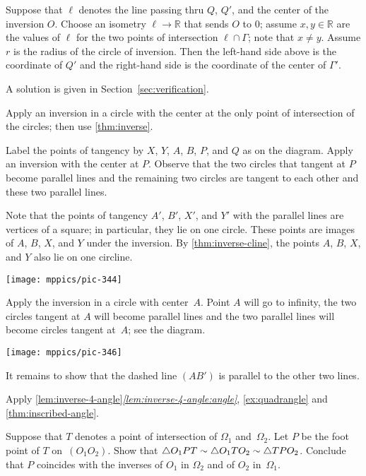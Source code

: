 \begin{multicols}{2}
Suppose that $\ell$ denotes the line passing thru $Q$, $Q'$, and the center of the inversion $O$.
Choose an isometry $\ell\to\mathbb{R}$ that sends $O$ to $0$;
assume $x,y\in \mathbb{R}$ are the values of $\ell$ for the two points of intersection $\ell\cap\Gamma$;
note that $x\ne y$.
Assume $r$ is the radius of the circle of inversion.
Then the left-hand side above is the coordinate of $Q'$ 
and the right-hand side is the coordinate of the center of $\Gamma'$.

A solution is given in Section~\ref{sec:verification}.

Apply an inversion in a circle with the center at the only point of intersection of the circles;
then use \ref{thm:inverse}.

Label the points of tangency by $X$, $Y$, $A$, $B$, $P$, and $Q$ as on the diagram.
Apply an inversion with the center at $P$. 
Observe that the two circles that tangent at $P$ become parallel lines and 
the remaining two circles are tangent to each other and these two parallel lines.

Note that the points of tangency $A'$, $B'$, $X'$, and $Y'$ with the parallel lines are vertices of a square;
in particular, they lie on one circle.
These points are images of $A$, $B$, $X$, and $Y$ under the inversion.
By \ref{thm:inverse-cline}, the points $A$, $B$, $X$, and $Y$ also lie on one circline.

\begin{Figure}
\centering
\texttt{[image: mppics/pic-344]}
\end{Figure}

Apply the inversion in a circle with center~$A$. 
Point $A$ will go to infinity, the two circles tangent at $A$ will become parallel lines
and the two parallel lines will become circles tangent at~$A$; see the diagram.

\begin{Figure}
\centering
\texttt{[image: mppics/pic-346]}
\end{Figure}

It remains to show that the dashed line $(AB')$ is parallel to the other two lines.

Apply \ref{lem:inverse-4-angle}\textit{\ref{lem:inverse-4-angle:angle}}, 
\ref{ex:quadrangle}
and \ref{thm:inscribed-angle}.

Suppose that $T$ denotes a point of intersection of $\Omega_1$ and~$\Omega_2$.
Let $P$ be the foot point of $T$ on~$(O_1O_2)$.
Show that
$\triangle O_1PT
\z\sim \triangle O_1TO_2
\z\sim \triangle TPO_2$.
Conclude that $P$ coincides with the inverses of $O_1$ in $\Omega_2$ and of $O_2$ in~$\Omega_1$.


\end{multicols}
